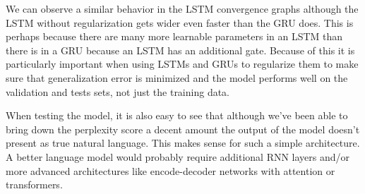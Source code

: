 \documentclass{article}
\begin{document}
We can observe a similar behavior in the LSTM convergence graphs although the LSTM without regularization gets wider even faster than the GRU does. This is perhaps because there are many more learnable parameters in an LSTM than there is in a GRU because an LSTM has an additional gate. Because of this it is particularly important when using LSTMs and GRUs to regularize them to make sure that generalization error is minimized and the model performs well on the validation and tests sets, not just the training data.

When testing the model, it is also easy to see that although we've been able to bring down the perplexity score a decent amount the output of the model doesn't present as true natural language. This makes sense for such a simple architecture. A better language model would probably require additional RNN layers and/or more advanced architectures like encode-decoder networks with attention or transformers.
\end{document}
